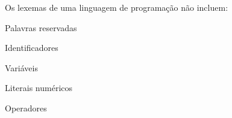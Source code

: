 \question[10]

Os lexemas de uma linguagem de programação não incluem:

\begin{choices}
\item Palavras reservadas
\item Identificadores
\item Variáveis %
\item Literais numéricos
\item Operadores
\end{choices}
\answerline

